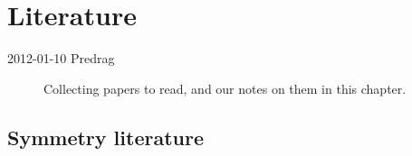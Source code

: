 
\chapter{Literature}
\label{c:lit}

\begin{description}

\item[2012-01-10 Predrag] Collecting papers to read, and our notes on them in
this chapter.

\end{description}

\section{Symmetry literature}
\label{sec:symmLit}

